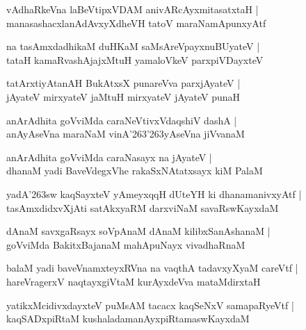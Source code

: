 \documentclass[twoside,12pt,openright]{book}
\def\S{\char'263}
\newcounter{shloka}[chapter]
\begin{document}
\begin{shloka}
vAdhaRkeVna laBeVtipxVDAM anivARcAyxmitasatxtaH |\\
manasashacxlanAdAvxyXdheVH tatoV maraNamApunxyAtf 
\end{shloka}

\begin{shloka}
na tasAmxdadhikaM duHKaM saMsAreVpayxnuBUyateV |\\
tataH kamaRvashAjajxMtuH yamaloVkeV parxpiVDayxteV 
\end{shloka}

\begin{shloka}
tatArxtiyAtanAH BukAtxsX punareVva parxjAyateV |\\
jAyateV mirxyateV jaMtuH mirxyateV jAyateV punaH 
\end{shloka}

\begin{shloka}
anArAdhita goVviMda caraNeVtivxVdaqshiV dashA |\\
anAyAseVna maraNaM vinA\S\S yAseVna jiVvanaM  
\end{shloka}

\begin{shloka}
anArAdhita goVviMda caraNasayx na jAyateV |\\
dhanaM yadi BaveVdegxVhe rakaSxNAtatxsayx kiM PalaM 
\end{shloka}

\begin{shloka}
yadA\S sw kaqSayxteV yAmeyxqqH dUteYH ki dhanamanivxyAtf |\\
tasAmxdidxvXjAti satAkxyaRM darxviNaM savaRswKayxdaM 
\end{shloka}

\begin{shloka}
dAnaM savxgaRsayx soVpAnaM dAnaM kilibxSanAshanaM |\\
goVviMda BakitxBajanaM mahApuNayx vivadhaRnaM 
\end{shloka}

\begin{shloka}
balaM yadi baveVnamxteyxRVna na vaqthA tadavxyXyaM careVtf |\\
hareVragerxV naqtayxgiVtaM kurAyxdeVva mataMdirxtaH 
\end{shloka}

\begin{shloka}
yatikxMcidivxdayxteV puMsAM tacacx kaqSeNxV samapaRyeVtf |\\
kaqSADxpiRtaM kushaladamanAyxpiRtamaswKayxdaM 
\end{shloka}
\end{document}
